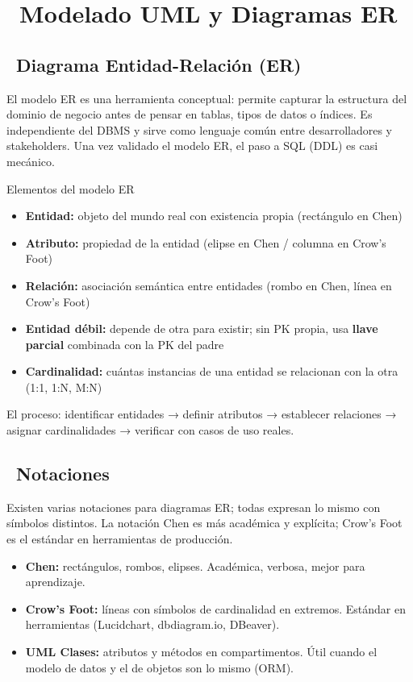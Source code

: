 \chapter[Modelado UML y Diagramas ER]{~Modelado UML y Diagramas ER}

\section[Diagrama Entidad-Relación (ER)]{~Diagrama Entidad-Relación (ER)}

El modelo ER es una herramienta conceptual: permite capturar la estructura del dominio de negocio antes de pensar en tablas, tipos de datos o índices.
Es independiente del DBMS y sirve como lenguaje común entre desarrolladores y stakeholders.
Una vez validado el modelo ER, el paso a SQL (DDL) es casi mecánico.

\begin{teoriabox}{Elementos del modelo ER}
\begin{itemize}
  \item \textbf{Entidad:} objeto del mundo real con existencia propia (rectángulo en Chen)
  \item \textbf{Atributo:} propiedad de la entidad (elipse en Chen / columna en Crow's Foot)
  \item \textbf{Relación:} asociación semántica entre entidades (rombo en Chen, línea en Crow's Foot)
  \item \textbf{Entidad débil:} depende de otra para existir; sin PK propia, usa \textbf{llave parcial} combinada con la PK del padre
  \item \textbf{Cardinalidad:} cuántas instancias de una entidad se relacionan con la otra (1:1, 1:N, M:N)
\end{itemize}
El proceso: identificar entidades → definir atributos → establecer relaciones → asignar cardinalidades → verificar con casos de uso reales.
\end{teoriabox}

\section[Notaciones]{~Notaciones}

Existen varias notaciones para diagramas ER; todas expresan lo mismo con símbolos distintos.
La notación Chen es más académica y explícita; Crow's Foot es el estándar en herramientas de producción.

\begin{itemize}
  \item \textbf{Chen:} rectángulos, rombos, elipses. Académica, verbosa, mejor para aprendizaje.
  \item \textbf{Crow's Foot:} líneas con símbolos de cardinalidad en extremos. Estándar en herramientas (Lucidchart, dbdiagram.io, DBeaver).
  \item \textbf{UML Clases:} atributos y métodos en compartimentos. Útil cuando el modelo de datos y el de objetos son lo mismo (ORM).
\end{itemize}

